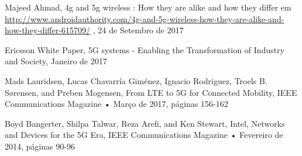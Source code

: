 \documentclass{llncs}
\begin{document}
\begin{thebibliography}{15}
Majeed Ahmad,
4g and 5g wireless : How they are alike and how they differ em
\url{http://www.androidauthority.com/4g-and-5g-wireless-how-they-are-alike-and-how-they-differ-615709/}
, 24 de Setembro de 2017

 Ericsson White Paper, 5G systems - Enabling the Transformation of Industry and Society, Janeiro de 2017

 Mads Lauridsen, Lucas Chavarría Giménez, Ignacio Rodriguez, Troels B. Sørensen, and Preben Mogensen, From LTE to 5G for Connected Mobility, IEEE Communications Magazine • Março de 2017, páginas 156-162

 Boyd Bangerter, Shilpa Talwar, Reza Arefi, and Ken Stewart, Intel, Networks and Devices for the 5G Era, IEEE Communications Magazine • Fevereiro de 2014, páginas 90-96

\end{thebibliography}
\end{document}

